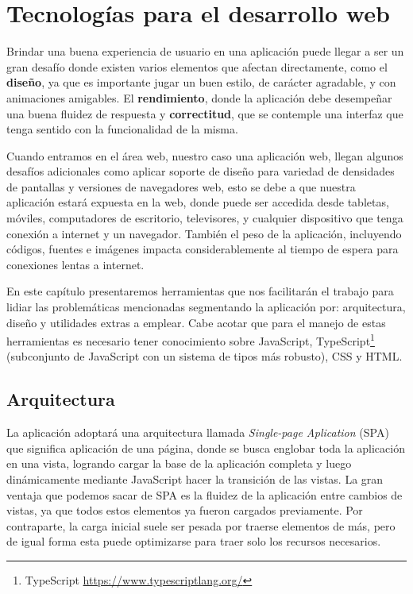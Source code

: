 \section{Tecnologías para el desarrollo web}
Brindar una buena experiencia de usuario en una aplicación puede llegar a ser un gran desafío donde existen varios elementos que afectan directamente, como el \textbf{diseño}, ya que es importante jugar un buen estilo, de carácter agradable, y con animaciones amigables. El \textbf{rendimiento}, donde la aplicación debe desempeñar una buena fluidez de respuesta y \textbf{correctitud}, que se contemple una interfaz que tenga sentido con la funcionalidad de la misma.

Cuando entramos en el área web, nuestro caso una aplicación web, llegan algunos desafíos adicionales como aplicar soporte de diseño para variedad de densidades de pantallas y versiones de navegadores web, esto se debe a que nuestra aplicación estará expuesta en la web, donde puede ser accedida desde tabletas, móviles, computadores de escritorio, televisores, y cualquier dispositivo que tenga conexión a internet y un navegador. También el peso de la aplicación, incluyendo códigos, fuentes e imágenes impacta considerablemente al tiempo de espera para conexiones lentas a internet.

En este capítulo presentaremos herramientas que nos facilitarán el trabajo para lidiar las problemáticas mencionadas segmentando la aplicación por: arquitectura, diseño y utilidades extras a emplear. Cabe acotar que para el manejo de estas herramientas es necesario tener conocimiento sobre JavaScript, TypeScript\footnote{TypeScript \url{https://www.typescriptlang.org/}} (subconjunto de JavaScript con un sistema de tipos más robusto), CSS y HTML.

\subsection{Arquitectura}

La aplicación adoptará una arquitectura llamada \textit{Single-page Aplication} \cite{WikiSPA} (SPA) que significa aplicación de una página, donde se busca englobar toda la aplicación en una vista, logrando cargar la base de la aplicación completa y luego dinámicamente mediante JavaScript hacer la transición de las vistas. La gran ventaja que podemos sacar de SPA es la fluidez de la aplicación entre cambios de vistas, ya que todos estos elementos ya fueron cargados previamente. Por contraparte, la carga inicial suele ser pesada por traerse elementos de más, pero de igual forma esta puede optimizarse para traer solo los recursos necesarios.

